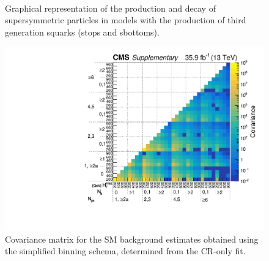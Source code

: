 \begin{figure}[h!]
    \begin{center}
        ~~
        ~~
        ~~
        \caption{
            Graphical representation of the production and decay of
            supersymmetric particles in models with the production of third
            generation squarks (stops and sbottoms).
        }
        \label{fig:simplified-models-feyn-3rdGen}
    \end{center}
\end{figure}

\clearpage
\begin{figure}
  \centering
  \includegraphics[width=\textwidth]{Supplementary/SimplifiedBinning_Covariance_aux}
  \caption{Covariance matrix for the SM background estimates obtained
    using the simplified binning schema, determined from the CR-only
    fit.  }
  \label{fig:covariance_aux}
\end{figure} 
\clearpage

